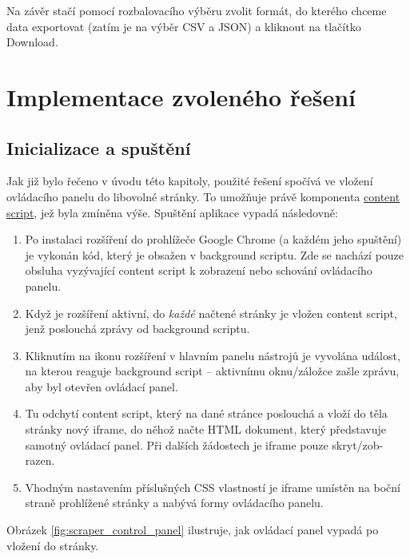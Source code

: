 \documentclass[thesis=B,czech]{FITthesis}[2012/06/26]
\begin{document}
Na závěr stačí pomocí rozbalovacího výběru zvolit formát, do kterého chceme data exportovat (zatím je na výběr CSV a JSON) a kliknout na tlačítko \textsf{Download}.

\newpage
\section{Implementace zvoleného řešení}
\subsection{Inicializace a spuštění}
Jak již bylo řečeno v úvodu této kapitoly, použité řešení spočívá ve vložení ovládacího panelu do libovolné stránky. To umožňuje právě komponenta \hyperref[def:content_script]{content script}, jež byla zmíněna výše. Spuštění aplikace vypadá následovně:
\begin{enumerate}
	\item Po instalaci rozšíření do prohlížeče Google Chrome (a každém jeho spuštění) je vykonán kód, který je obsažen v background scriptu. Zde se nachází pouze obsluha vyzývající content script k zobrazení nebo schování ovládacího panelu.
	\item Když je rozšíření aktivní, do \emph{každé} načtené stránky je vložen content script, jenž poslouchá zprávy od background scriptu.
	\item Kliknutím na ikonu rozšíření v hlavním panelu nástrojů je vyvolána událost, na kterou reaguje background script -- aktivnímu oknu/záložce zašle zprávu, aby byl otevřen ovládací panel. 
	\item Tu odchytí content script, který na dané stránce poslouchá a vloží do těla stránky nový iframe, do něhož načte HTML dokument, který představuje samotný ovládací panel. Při dalších žádostech je iframe pouze skryt/zob-razen.
	\item Vhodným nastavením příslušných CSS vlastností je iframe umístěn na boční straně prohlížené stránky a nabývá formy ovládacího panelu. 
\end{enumerate}
Obrázek \ref{fig:scraper_control_panel} ilustruje, jak ovládací panel vypadá po vložení do stránky.
\end{document}
